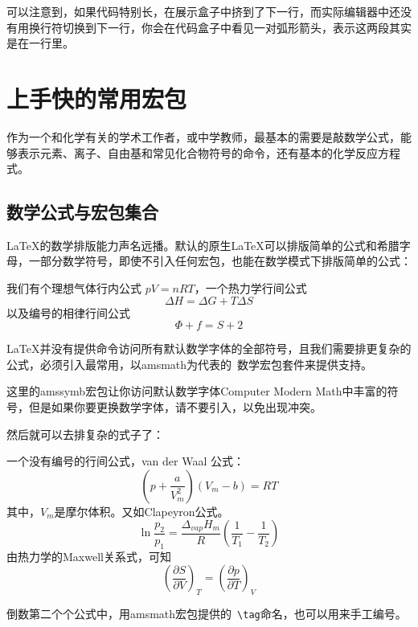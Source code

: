\documentclass[a4paper,UTF8,zihao = -4]{ctexart} %
\begin{document}
\noindent 可以注意到，如果代码特别长，在展示盒子中挤到了下一行，而实际编辑器中还没有用换行符切换到下一行，你会在代码盒子中看见一对弧形箭头，表示这两段其实是在一行里。

\section{上手快的常用宏包}
\label{sec:elementaryUsage}

作为一个和化学有关的学术工作者，或中学教师，最基本的需要是敲数学公式，能够表示元素、离子、自由基和常见化合物符号的命令，还有基本的化学反应方程式。

\subsection{数学公式与\AmS{}宏包集合}
\label{sec:mathPkg}

\LaTeX{}的数学排版能力声名远播。默认的原生\LaTeX{}可以排版简单的公式和希腊字母，一部分数学符号，即使不引入任何宏包，也能在数学模式下排版简单的公式：


\begin{dispExample}
我们有个理想气体行内公式 $ pV = nRT $，一个热力学行间公式
\[
  \Delta H = \Delta G + T\Delta S
\]
以及编号的相律行间公式
\begin{equation}
  \Phi + f = S + 2
\end{equation}
\end{dispExample}

\LaTeX{}并没有提供命令访问所有默认数学字体的全部符号，且我们需要排更复杂的公式，必须引入最常用，以\textsf{amsmath}为代表的~\AmS{}数学宏包套件来提供支持。
\begin{dispListing}
\usepackage{amsmath} %
\usepackage{amssymb}
\end{dispListing}
这里的\textsf{amssymb}宏包让你访问默认数学字体Computer Modern Math中丰富的符号，但是如果你要更换数学字体，请不要引入，以免出现冲突。

然后就可以去排复杂的式子了：
\begin{dispExample}
一个没有编号的行间公式，van der Waal 公式：
\[
  \left( p + \dfrac{a}{V_m^2} \right)(V_m - b) = RT
\]
其中，$V_m$是摩尔体积。又如Clapeyron公式。
\begin{equation}
  \ln\dfrac{p_2}{p_1}=\dfrac{\Delta _{vap}H_m}{R}\left(\dfrac{1}{T_1} - \dfrac{1}{T_2}\right)   \tag{Clapeyron's Equation}
\end{equation}
由热力学的Maxwell关系式，可知
\begin{equation}
  \left(\dfrac{\partial S}{\partial V}\right)_T = \left(\dfrac{\partial p}{\partial T}\right)_V
\end{equation}
\end{dispExample}
倒数第二个个公式中，用\textsf{amsmath}宏包提供的~\verb|\tag|命名，也可以用来手工编号。
\end{document}
